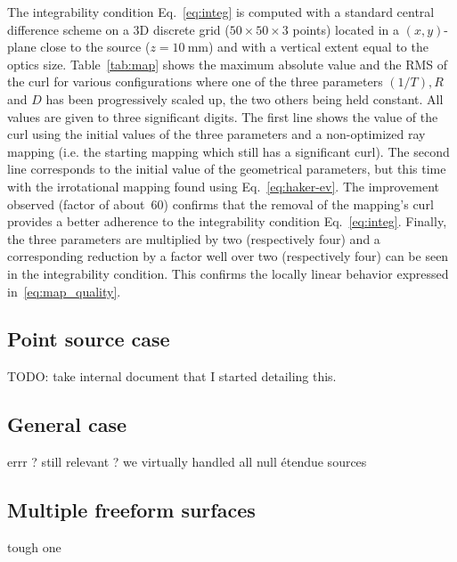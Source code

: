 The integrability condition Eq.~\eqref{eq:integ} is computed with a
standard central difference scheme on a 3D discrete grid ($50\times 50
\times 3$ points) located in a $(x,y)$-plane close to the source
($z=10\mathrm{~mm}$) and with a vertical extent equal to the optics
size. Table~\ref{tab:map} shows the maximum absolute value and the RMS
of the curl for various configurations where one of the three parameters
$(1/T), R$ and $D$ has been progressively scaled up, the two others being 
held constant. All values are
given to three significant digits. The first line shows the value of
the curl using the initial values of the three parameters and a
non-optimized ray mapping (i.e. the starting mapping which still has a
significant curl). The second line corresponds to the initial value of
the geometrical parameters, but this time with the irrotational
mapping found using Eq.~\ref{eq:haker-ev}.  The improvement observed
(factor of about~60) confirms that the removal of the mapping's curl
provides a better adherence to the integrability condition
Eq.~\eqref{eq:integ}.  Finally, the three parameters are multiplied by
two (respectively four) and a corresponding reduction by a factor well
over two (respectively four) can be seen in the integrability
condition. This confirms the locally linear behavior expressed
in~\eqref{eq:map_quality}.


\subsection{Point source case}

TODO: take internal document that I started detailing this.

\subsection{General case}

errr ? still relevant ? we virtually handled all null étendue sources

\subsection{Multiple freeform surfaces}

tough one

